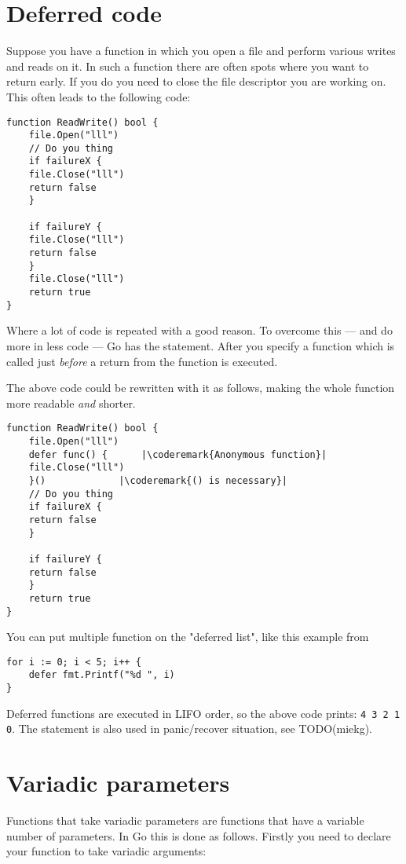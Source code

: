 \section{Deferred code}
Suppose you have a function in which you open a file and perform various
writes and reads on it. In such a function there are often spots where
you want to return early. If you do you need to close the file
descriptor you are working on. This often leads to the following code:
\begin{lstlisting}[caption=Without \func{defer}]
function ReadWrite() bool {
    file.Open("lll")
    // Do you thing
    if failureX {
	file.Close("lll")
	return false
    }

    if failureY {
	file.Close("lll")
	return false
    }
    file.Close("lll")
    return true
}
\end{lstlisting}
Where a lot of code is repeated with a good reason. To overcome this ---
and do more in less code --- Go has the  statement. After
 you specify a function which is called just \emph{before} a
return from the function is executed.

The above code could be rewritten with it as follows, making the whole
function more readable \emph{and} shorter.
\begin{lstlisting}[caption=With \func{defer}]
function ReadWrite() bool {
    file.Open("lll")
    defer func() {	    |\coderemark{Anonymous function}|
	file.Close("lll")
    }()			    |\coderemark{() is necessary}|
    // Do you thing
    if failureX {
	return false
    }

    if failureY {
	return false
    }
    return true
}
\end{lstlisting}

You can put multiple function on the "deferred list", like this
example from \cite{effective_go} 
\begin{lstlisting}
for i := 0; i < 5; i++ { 
    defer fmt.Printf("%d ", i) 
} 
\end{lstlisting}
Deferred functions are executed in LIFO order, so the above code
prints: \lstinline{4 3 2 1 0}. The  statement is 
also used in panic/recover situation, see TODO(miekg).

\section{Variadic parameters}
Functions that take variadic parameters are functions that have a
variable number of parameters. In Go this is done as follows.
Firstly you need to declare your function to take variadic arguments:

